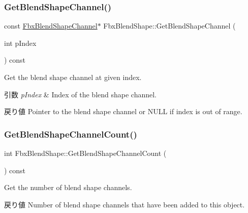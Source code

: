 \subsubsection{\texorpdfstring{Get\+Blend\+Shape\+Channel()}{GetBlendShapeChannel()}\hspace{0.1cm}{\footnotesize\ttfamily [2/2]}}
{\footnotesize\ttfamily const \hyperlink{class_fbx_blend_shape_channel}{Fbx\+Blend\+Shape\+Channel}$\ast$ Fbx\+Blend\+Shape\+::\+Get\+Blend\+Shape\+Channel (\begin{DoxyParamCaption}\item[{int}]{p\+Index }\end{DoxyParamCaption}) const}

Get the blend shape channel at given index. 
\begin{DoxyParams}{引数}
{\em p\+Index} & Index of the blend shape channel. \\
\hline
\end{DoxyParams}
\begin{DoxyReturn}{戻り値}
Pointer to the blend shape channel or {\ttfamily N\+U\+LL} if index is out of range. 
\end{DoxyReturn}
\mbox{\label{class_fbx_blend_shape_aed732607e7af47260646f394897a6855}} 
\subsubsection{\texorpdfstring{Get\+Blend\+Shape\+Channel\+Count()}{GetBlendShapeChannelCount()}}
{\footnotesize\ttfamily int Fbx\+Blend\+Shape\+::\+Get\+Blend\+Shape\+Channel\+Count (\begin{DoxyParamCaption}{ }\end{DoxyParamCaption}) const}

Get the number of blend shape channels. \begin{DoxyReturn}{戻り値}
Number of blend shape channels that have been added to this object. 
\end{DoxyReturn}
\mbox{\label{class_fbx_blend_shape_afc886286ac95264b993335d8b3954b4f}} 
